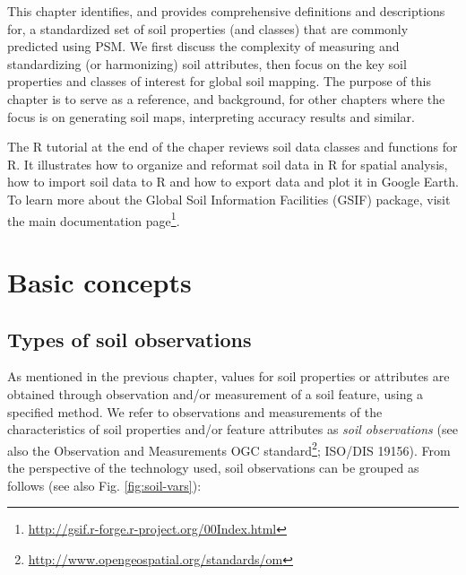 \documentclass[graybox,natbib,nospthms,UStrade]{svmono}
\renewcommand{\href}[2]{#2 (\url{#1})}
\renewcommand{\href}[2]{#2\footnote{\url{#1}}}
\begin{document}
This chapter identifies, and provides comprehensive definitions and
descriptions for, a standardized set of soil properties (and classes) that are
commonly predicted using PSM. We first discuss the complexity of measuring and standardizing (or harmonizing) soil attributes, then focus on the key soil properties and classes of interest for global soil
mapping. The purpose of this chapter is to serve as a reference, and background, for other
chapters where the focus is on generating soil maps, interpreting
accuracy results and similar.

The R tutorial at the end of the chaper reviews soil data classes and
functions for R. It illustrates how to organize and reformat soil data in R for spatial analysis,
how to import soil data to R and how to export data and plot it in Google Earth.
To learn more about the Global Soil Information Facilities (GSIF) package,
visit the main \href{http://gsif.r-forge.r-project.org/00Index.html}{documentation page}.

\hypertarget{basic-concepts-1}{%
\section{Basic concepts}\label{basic-concepts-1}}

\hypertarget{types-of-soil-observations}{%
\subsection{Types of soil observations}\label{types-of-soil-observations}}

As mentioned in the previous chapter, values for soil properties or
attributes are obtained through observation and/or measurement of a soil
feature, using a specified method. We refer to observations and
measurements of the characteristics of soil properties and/or feature
attributes as \emph{soil observations} (see also the \href{http://www.opengeospatial.org/standards/om}{Observation and Measurements
OGC standard}; ISO/DIS 19156). From the perspective of the technology
used, soil observations can be grouped as follows (see also
Fig. \ref{fig:soil-vars}):
\end{document}
